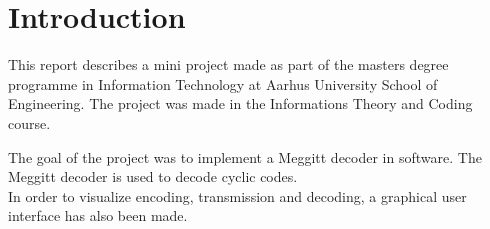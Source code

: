 \documentclass[Main]{subfiles}
\begin{document}
\chapter{Introduction}

This report describes a mini project made as part of the masters degree programme in Information Technology at Aarhus University School of Engineering. The project was made in the Informations Theory and Coding course.

The goal of the project was to implement a Meggitt decoder in software. The Meggitt decoder is used to decode cyclic codes. 
\\In order to visualize encoding, transmission and decoding, a graphical user interface has also been made.  
\end{document}
